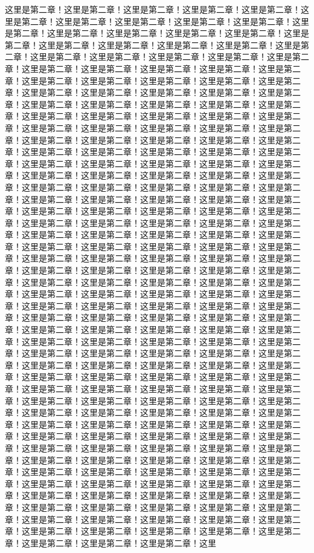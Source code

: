 这里是第二章！这里是第二章！这里是第二章！这里是第二章！这里是第二章！这里是第二章！这里是第二章！这里是第二章！这里是第二章！这里是第二章！这里是第二章！这里是第二章！这里是第二章！这里是第二章！这里是第二章！这里是第二章！这里是第二章！这里是第二章！这里是第二章！这里是第二章！这里是第二章！这里是第二章！这里是第二章！这里是第二章！这里是第二章！这里是第二章！这里是第二章！这里是第二章！这里是第二章！这里是第二章！这里是第二章！这里是第二章！这里是第二章！这里是第二章！这里是第二章！这里是第二章！这里是第二章！这里是第二章！这里是第二章！这里是第二章！这里是第二章！这里是第二章！这里是第二章！这里是第二章！这里是第二章！这里是第二章！这里是第二章！这里是第二章！这里是第二章！这里是第二章！这里是第二章！这里是第二章！这里是第二章！这里是第二章！这里是第二章！这里是第二章！这里是第二章！这里是第二章！这里是第二章！这里是第二章！这里是第二章！这里是第二章！这里是第二章！这里是第二章！这里是第二章！这里是第二章！这里是第二章！这里是第二章！这里是第二章！这里是第二章！这里是第二章！这里是第二章！这里是第二章！这里是第二章！这里是第二章！这里是第二章！这里是第二章！这里是第二章！这里是第二章！这里是第二章！这里是第二章！这里是第二章！这里是第二章！这里是第二章！这里是第二章！这里是第二章！这里是第二章！这里是第二章！这里是第二章！这里是第二章！这里是第二章！这里是第二章！这里是第二章！这里是第二章！这里是第二章！这里是第二章！这里是第二章！这里是第二章！这里是第二章！这里是第二章！这里是第二章！这里是第二章！这里是第二章！这里是第二章！这里是第二章！这里是第二章！这里是第二章！这里是第二章！这里是第二章！这里是第二章！这里是第二章！这里是第二章！这里是第二章！这里是第二章！这里是第二章！这里是第二章！这里是第二章！这里是第二章！这里是第二章！这里是第二章！这里是第二章！这里是第二章！这里是第二章！这里是第二章！这里是第二章！这里是第二章！这里是第二章！这里是第二章！这里是第二章！这里是第二章！这里是第二章！这里是第二章！这里是第二章！这里是第二章！这里是第二章！这里是第二章！这里是第二章！这里是第二章！这里是第二章！这里是第二章！这里是第二章！这里是第二章！这里是第二章！这里是第二章！这里是第二章！这里是第二章！这里是第二章！这里是第二章！这里是第二章！这里是第二章！这里是第二章！这里是第二章！这里是第二章！这里是第二章！这里是第二章！这里是第二章！这里是第二章！这里是第二章！这里是第二章！这里是第二章！这里是第二章！这里是第二章！这里是第二章！这里是第二章！这里是第二章！这里是第二章！这里是第二章！这里是第二章！这里是第二章！这里是第二章！这里是第二章！这里是第二章！这里是第二章！这里是第二章！这里是第二章！这里是第二章！这里是第二章！这里是第二章！这里是第二章！这里是第二章！这里是第二章！这里是第二章！这里是第二章！这里是第二章！这里是第二章！这里是第二章！这里是第二章！这里是第二章！这里是第二章！这里是第二章！这里是第二章！这里是第二章！这里是第二章！这里是第二章！这里是第二章！这里是第二章！这里是第二章！这里是第二章！这里是第二章！这里是第二章！这里是第二章！这里是第二章！这里是第二章！这里是第二章！这里是第二章！这里是第二章！这里是第二章！这里是第二章！这里是第二章！这里是第二章！这里是第二章！这里是第二章！这里是第二章！这里是第二章！这里是第二章！这里是第二章！这里是第二章！这里是第二章！这里是第二章！这里是第二章！这里是第二章！这里是第二章！这里是第二章！这里是第二章！这里是第二章！这里是第二章！这里是第二章！这里是第二章！这里是第二章！这里